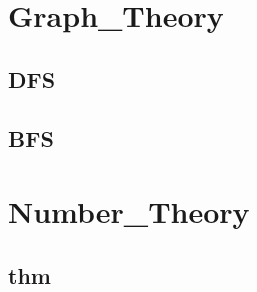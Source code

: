 \section{Graph_Theory}
    \subsection{DFS}
        
    \subsection{BFS}
        

\section{Number_Theory}
    \subsection{thm}
        